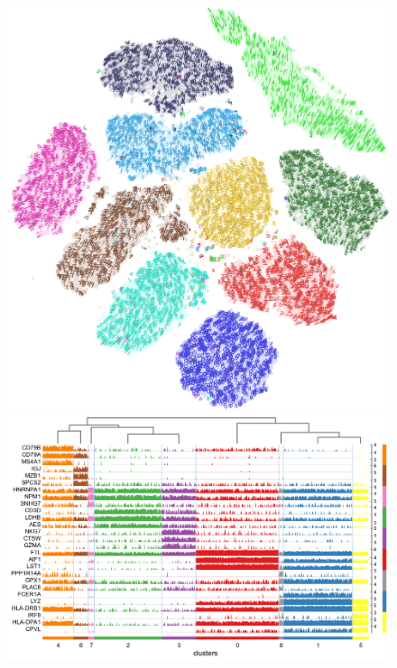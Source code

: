 \documentclass[final]{juliacon}
\begin{document}
\begin{figure}
  \begin{minipage}{0.36\linewidth}
    \includegraphics[width=\linewidth]
    {images/scenarios/mnist-sgtsnepi.png}
  \end{minipage}
  \begin{minipage}{0.32\linewidth}
    \includegraphics[width=\linewidth]
    {images/scenarios/gene-cells-barcode.png}
    \vspace*{0.5em}

\end{minipage}
\end{figure}
\end{document}

